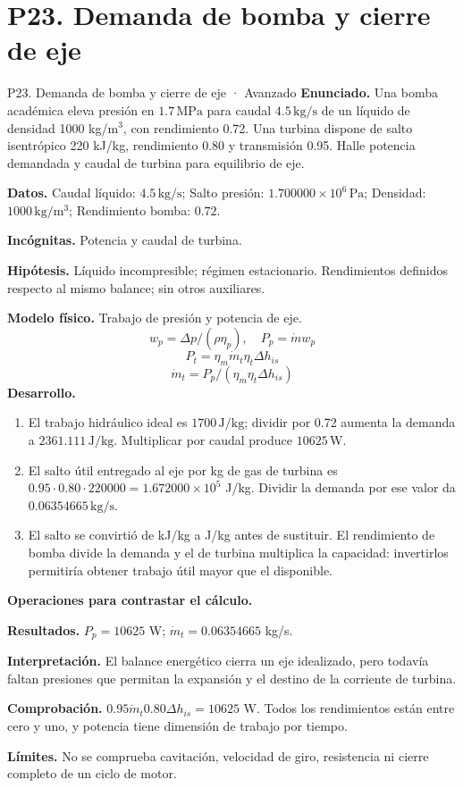 \section{P23. Demanda de bomba y cierre de eje}
\begin{studiumworked}{P23. Demanda de bomba y cierre de eje · Avanzado}
\textbf{Enunciado.} Una bomba académica eleva presión en $1.7\,\mathrm{MPa}$ para caudal $4.5\,\mathrm{kg/s}$ de un líquido de densidad 1000 kg/m$^3$, con rendimiento 0.72. Una turbina dispone de salto isentrópico 220 kJ/kg, rendimiento 0.80 y transmisión 0.95. Halle potencia demandada y caudal de turbina para equilibrio de eje.

\textbf{Datos.} Caudal líquido: $4.5\,\mathrm{kg/s}$; Salto presión: $1.700000\times10^{6}\,\mathrm{Pa}$; Densidad: $1000\,\mathrm{kg/m^3}$; Rendimiento bomba: $0.72$.

\textbf{Incógnitas.} Potencia y caudal de turbina.

\textbf{Hipótesis.} Líquido incompresible; régimen estacionario. Rendimientos definidos respecto al mismo balance; sin otros auxiliares.

\textbf{Modelo físico.} Trabajo de presión y potencia de eje.
\[w_p=\Delta p/(\rho\eta_p),\quad P_p=\dot m w_p\]
\[P_t=\eta_m\dot m_t\eta_t\Delta h_{is}\]
\[\dot m_t=P_p/(\eta_m\eta_t\Delta h_{is})\]
\textbf{Desarrollo.}
\begin{enumerate}
\item El trabajo hidráulico ideal es $1700\,\mathrm{J/kg}$; dividir por 0.72 aumenta la demanda a $2361.111\,\mathrm{J/kg}$. Multiplicar por caudal produce $10625\,\mathrm{W}$.
\item El salto útil entregado al eje por kg de gas de turbina es $0.95\cdot0.80\cdot220000=1.672000\times10^{5}$ J/kg. Dividir la demanda por ese valor da $0.06354665\,\mathrm{kg/s}$.
\item El salto se convirtió de kJ/kg a J/kg antes de sustituir. El rendimiento de bomba divide la demanda y el de turbina multiplica la capacidad: invertirlos permitiría obtener trabajo útil mayor que el disponible.
\end{enumerate}
\textbf{Operaciones para contrastar el cálculo.}

\textbf{Resultados.} $P_p=10625$ W; $\dot m_t=0.06354665$ kg/s.

\textbf{Interpretación.} El balance energético cierra un eje idealizado, pero todavía faltan presiones que permitan la expansión y el destino de la corriente de turbina.

\textbf{Comprobación.} $0.95\dot m_t0.80\Delta h_{is}=10625$ W. Todos los rendimientos están entre cero y uno, y potencia tiene dimensión de trabajo por tiempo.

\textbf{Límites.} No se comprueba cavitación, velocidad de giro, resistencia ni cierre completo de un ciclo de motor.
\end{studiumworked}
